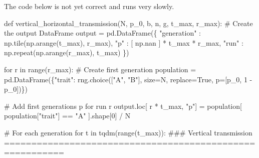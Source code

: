 \documentclass[
  a4paperpaper,
  ,captions=tableheading
]{scrbook}
\newenvironment{Shaded}{\begin{snugshade}}{\end{snugshade}}
\newcommand{\BuiltInTok}[1]{\textcolor[rgb]{0.00,0.23,0.31}{#1}}
\newcommand{\CommentTok}[1]{\textcolor[rgb]{0.37,0.37,0.37}{#1}}
\newcommand{\ControlFlowTok}[1]{\textcolor[rgb]{0.00,0.23,0.31}{#1}}
\newcommand{\DecValTok}[1]{\textcolor[rgb]{0.68,0.00,0.00}{#1}}
\newcommand{\KeywordTok}[1]{\textcolor[rgb]{0.00,0.23,0.31}{#1}}
\newcommand{\NormalTok}[1]{\textcolor[rgb]{0.00,0.23,0.31}{#1}}
\newcommand{\OperatorTok}[1]{\textcolor[rgb]{0.37,0.37,0.37}{#1}}
\newcommand{\StringTok}[1]{\textcolor[rgb]{0.13,0.47,0.30}{#1}}
\newcommand{\VariableTok}[1]{\textcolor[rgb]{0.07,0.07,0.07}{#1}}
\begin{document}
\begin{tcolorbox}[enhanced jigsaw, arc=.35mm, colbacktitle=quarto-callout-warning-color!10!white, colback=white, breakable, toprule=.15mm, title=\textcolor{quarto-callout-warning-color}{\faExclamationTriangle}\hspace{0.5em}{Warning}, left=2mm, bottomtitle=1mm, toptitle=1mm, leftrule=.75mm, opacitybacktitle=0.6, titlerule=0mm, opacityback=0, rightrule=.15mm, bottomrule=.15mm, coltitle=black, colframe=quarto-callout-warning-color-frame]

The code below is not yet correct and runs very slowly.

\end{tcolorbox}

\begin{Shaded}
\begin{Highlighting}[]
\KeywordTok{def}\NormalTok{ vertical\_horizontal\_transmission(N, p\_0, b, n, g, t\_max, r\_max):}
    \CommentTok{\# Create the output DataFrame}
\NormalTok{    output }\OperatorTok{=}\NormalTok{ pd.DataFrame(\{}
        \StringTok{"generation"}\NormalTok{ : np.tile(np.arange(t\_max), r\_max),}
        \StringTok{"p"}\NormalTok{ : [ np.nan ] }\OperatorTok{*}\NormalTok{ t\_max }\OperatorTok{*}\NormalTok{ r\_max,}
        \StringTok{"run"}\NormalTok{ : np.repeat(np.arange(r\_max), t\_max)}
\NormalTok{    \})}

    \ControlFlowTok{for}\NormalTok{ r }\KeywordTok{in} \BuiltInTok{range}\NormalTok{(r\_max):}
        \CommentTok{\# Create first generation}
\NormalTok{        population }\OperatorTok{=}\NormalTok{ pd.DataFrame(\{}\StringTok{"trait"}\NormalTok{: rng.choice([}\StringTok{"A"}\NormalTok{, }\StringTok{"B"}\NormalTok{], size}\OperatorTok{=}\NormalTok{N, replace}\OperatorTok{=}\VariableTok{True}\NormalTok{, p}\OperatorTok{=}\NormalTok{[p\_0, }\DecValTok{1} \OperatorTok{{-}}\NormalTok{ p\_0])\})}

        \CommentTok{\# Add first generation\textquotesingle{}s p for run r}
\NormalTok{        output.loc[ r }\OperatorTok{*}\NormalTok{ t\_max, }\StringTok{"p"}\NormalTok{] }\OperatorTok{=}\NormalTok{ population[ population[}\StringTok{"trait"}\NormalTok{] }\OperatorTok{==} \StringTok{"A"}\NormalTok{ ].shape[}\DecValTok{0}\NormalTok{] }\OperatorTok{/}\NormalTok{ N}

        \CommentTok{\# For each generation }
        \ControlFlowTok{for}\NormalTok{ t }\KeywordTok{in}\NormalTok{ tqdm(}\BuiltInTok{range}\NormalTok{(t\_max)):}
            \CommentTok{\#\#\# Vertical transmission =========================================================}


\end{Highlighting}
\end{Shaded}
\end{document}
